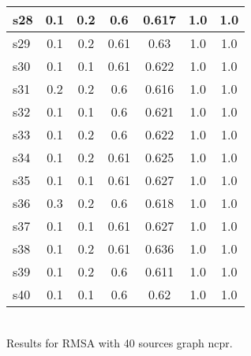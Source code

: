 \documentclass{article}
\begin{document}
\begin{tabular}{|l|c|c|c|c|c|c|}
\hline
s28 &0.1 & 0.2 & 0.6 & 0.617 & 1.0 & 1.0\\
\hline
s29 &0.1 & 0.2 & 0.61 & 0.63 & 1.0 & 1.0\\
\hline
s30 &0.1 & 0.1 & 0.61 & 0.622 & 1.0 & 1.0\\
\hline
s31 &0.2 & 0.2 & 0.6 & 0.616 & 1.0 & 1.0\\
\hline
s32 &0.1 & 0.1 & 0.6 & 0.621 & 1.0 & 1.0\\
\hline
s33 &0.1 & 0.2 & 0.6 & 0.622 & 1.0 & 1.0\\
\hline
s34 &0.1 & 0.2 & 0.61 & 0.625 & 1.0 & 1.0\\
\hline
s35 &0.1 & 0.1 & 0.61 & 0.627 & 1.0 & 1.0\\
\hline
s36 &0.3 & 0.2 & 0.6 & 0.618 & 1.0 & 1.0\\
\hline
s37 &0.1 & 0.1 & 0.61 & 0.627 & 1.0 & 1.0\\
\hline
s38 &0.1 & 0.2 & 0.61 & 0.636 & 1.0 & 1.0\\
\hline
s39 &0.1 & 0.2 & 0.6 & 0.611 & 1.0 & 1.0\\
\hline
s40 &0.1 & 0.1 & 0.6 & 0.62 & 1.0 & 1.0\\
\hline
\end{tabular}\\

\noindent Results for RMSA with 40 sources graph ncpr.
\end{document}

